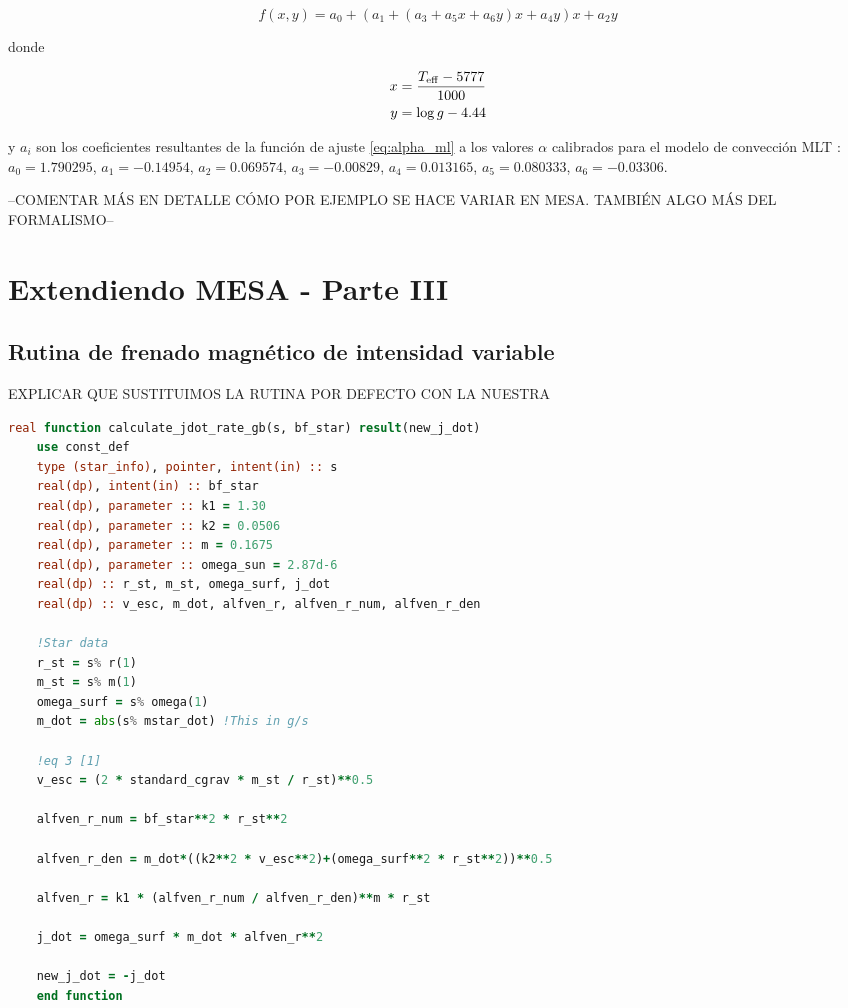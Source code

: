 \begin{ceqn}
	\begin{equation}
		f(x,y) = a_0 + (a_1 + (a_3 + a_5x +a_6y)x + a_4y)x + a_2y\label{eq:alpha_ml}
	\end{equation}
\end{ceqn}

donde

\begin{ceqn}
	\begin{align}
		x &= \frac{T_{\mathrm{eff}}-5777}{1000} \label{eq:eq:alpha_x}\\
		y &= \mathrm{log} \, g-4.44 \label{eq:eq:alpha_y}
	\end{align}
\end{ceqn}

y $a_i$ son los coeficientes resultantes de la función de ajuste \ref{eq:alpha_ml} a los valores $\alpha$ calibrados para el modelo de convección MLT \cite{Sonoi2018}: $a_0=1.790295$, $a_1=-0.14954$, $a_2=0.069574$, $a_3=-0.00829$, $a_4=0.013165$, $a_5=0.080333$, $a_6=-0.03306$. \par
--COMENTAR MÁS EN DETALLE CÓMO POR EJEMPLO SE HACE VARIAR EN MESA. TAMBIÉN ALGO MÁS DEL FORMALISMO--



\section{Extendiendo MESA - Parte III}
\subsection{Rutina de frenado magnético de intensidad variable}
EXPLICAR QUE SUSTITUIMOS LA RUTINA POR DEFECTO CON LA NUESTRA
\begin{lstlisting}[language=Fortran, caption={Rutina de par de torsión.}, label={lst:jdot_gb}]
	real function calculate_jdot_rate_gb(s, bf_star) result(new_j_dot)
	use const_def
	type (star_info), pointer, intent(in) :: s
	real(dp), intent(in) :: bf_star
	real(dp), parameter :: k1 = 1.30
	real(dp), parameter :: k2 = 0.0506
	real(dp), parameter :: m = 0.1675
	real(dp), parameter :: omega_sun = 2.87d-6
	real(dp) :: r_st, m_st, omega_surf, j_dot
	real(dp) :: v_esc, m_dot, alfven_r, alfven_r_num, alfven_r_den
	
	!Star data
	r_st = s% r(1)
	m_st = s% m(1)
	omega_surf = s% omega(1)
	m_dot = abs(s% mstar_dot) !This in g/s
	
	!eq 3 [1]
	v_esc = (2 * standard_cgrav * m_st / r_st)**0.5
	
	alfven_r_num = bf_star**2 * r_st**2
	
	alfven_r_den = m_dot*((k2**2 * v_esc**2)+(omega_surf**2 * r_st**2))**0.5
	
	alfven_r = k1 * (alfven_r_num / alfven_r_den)**m * r_st
	
	j_dot = omega_surf * m_dot * alfven_r**2
	
	new_j_dot = -j_dot
	end function
	
\end{lstlisting}


